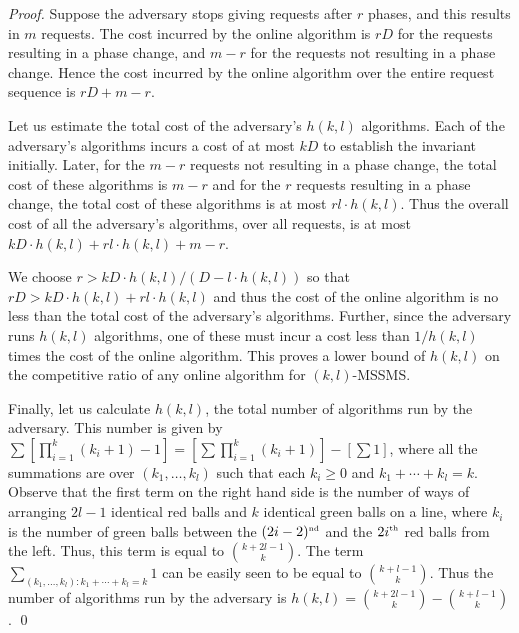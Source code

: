 \documentclass[11pt]{article}
\theoremstyle{plain}\newtheorem{theorem}{Theorem}
\theoremstyle{definition}
\theoremstyle{remark}
\begin{document}
\begin{proof}
Suppose the adversary stops giving requests after $r$ phases, and this results in $m$ requests. The cost incurred by the online algorithm is $rD$ for the requests resulting in a phase change, and $m-r$ for the requests not resulting in a phase change. Hence the cost incurred by the online algorithm over the entire request sequence is $rD+m-r$.

Let us estimate the total cost of the adversary's $h(k,l)$ algorithms. Each of the adversary's algorithms incurs a cost of at most $kD$ to establish the invariant initially. Later, for the $m-r$ requests not resulting in a phase change, the total cost of these algorithms is $m-r$ and for the $r$ requests resulting in a phase change, the total cost of these algorithms is at most $rl\cdot h(k,l)$. Thus the overall cost of all the adversary's algorithms, over all requests, is at most $kD\cdot h(k,l)+rl\cdot h(k,l)+m-r$.

We choose $r>kD\cdot h(k,l)/\left(D-l\cdot h(k,l)\right)$ so that $rD>kD\cdot h(k,l)+rl\cdot h(k,l)$
and thus the cost of the online algorithm is no less than the total cost of the adversary's algorithms. Further, since the adversary runs $h(k,l)$ algorithms, one of these must incur a cost less than $1/h(k,l)$ times the cost of the online algorithm. This proves a lower bound of $h(k,l)$ on the competitive ratio of any online algorithm for $(k,l)$-MSSMS.

Finally, let us calculate $h(k,l)$, the total number of algorithms run by the adversary. This number is given by $\sum\left[\prod_{i=1}^k(k_i+1)-1\right]=\left[\sum\prod_{i=1}^k(k_i+1)\right]-\left[\sum1\right]$, where all the summations are over $(k_1,\ldots,k_l)$ such that each $k_i\geq0$ and $k_1+\cdots+k_l=k$.
Observe that the first term on the right hand side is the number of ways of arranging $2l-1$ identical red balls and $k$ identical green balls on a line, where $k_i$ is the number of green balls between the $(2i-2)^{\text{\tiny{nd}}}$ and the ${2i}^{\text{\tiny{th}}}$ red balls from the left. Thus, this term is equal to ${{k+2l-1}\choose{k}}$. The term $\sum_{(k_1,\ldots,k_l):k_1+\cdots+k_l=k}1$ can be easily seen to be equal to ${k+l-1}\choose{k}$. Thus the number of algorithms run by the adversary is $h(k,l)={{k+2l-1}\choose{k}}-{{k+l-1}\choose{k}}$. \qed
\end{proof}
\end{document}
